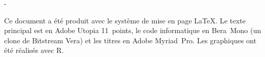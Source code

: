 \thispagestyle{empty}
\vspace*{\fill}

\begingroup
\calccentering{\unitlength}
\begin{adjustwidth*}{\unitlength}{-\unitlength}
  \begin{flushleft}
    \small %
    Ce document a été produit avec le système de mise en page
    {\LaTeX}. Le texte principal est en Adobe Utopia 11~points, le code
    informatique en Bera~Mono (un clone de Bitstream Vera) et les titres
    en Adobe Myriad~Pro. Les graphiques ont été réalisés avec R.
  \end{flushleft}
\end{adjustwidth*}
\endgroup
\vfill
